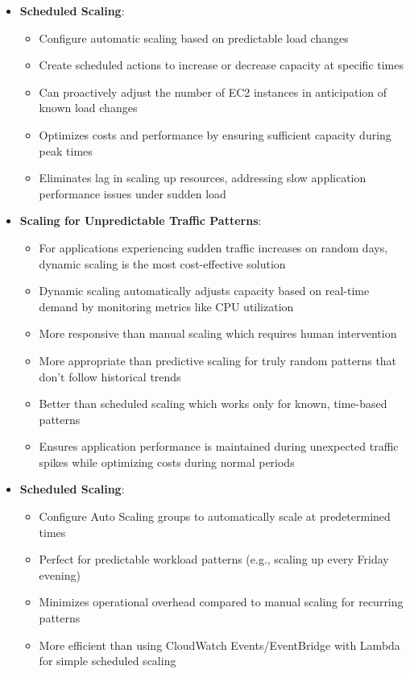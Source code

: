 \documentclass[11pt,a4paper]{report}
\begin{document}
\begin{itemize}
  \item \textbf{Scheduled Scaling}:
\begin{itemize}
  \item Configure automatic scaling based on predictable load changes
  \item Create scheduled actions to increase or decrease capacity at specific times
  \item Can proactively adjust the number of EC2 instances in anticipation of known load changes
  \item Optimizes costs and performance by ensuring sufficient capacity during peak times
  \item Eliminates lag in scaling up resources, addressing slow application performance issues under sudden load
\end{itemize}
  \item \textbf{Scaling for Unpredictable Traffic Patterns}:
\begin{itemize}
  \item For applications experiencing sudden traffic increases on random days, dynamic scaling is the most cost-effective solution
  \item Dynamic scaling automatically adjusts capacity based on real-time demand by monitoring metrics like CPU utilization
  \item More responsive than manual scaling which requires human intervention
  \item More appropriate than predictive scaling for truly random patterns that don't follow historical trends
  \item Better than scheduled scaling which works only for known, time-based patterns
  \item Ensures application performance is maintained during unexpected traffic spikes while optimizing costs during normal periods
\end{itemize}
  \item \textbf{Scheduled Scaling}:
\begin{itemize}
  \item Configure Auto Scaling groups to automatically scale at predetermined times
  \item Perfect for predictable workload patterns (e.g., scaling up every Friday evening)
  \item Minimizes operational overhead compared to manual scaling for recurring patterns
  \item More efficient than using CloudWatch Events/EventBridge with Lambda for simple scheduled scaling

\end{itemize}
\end{itemize}
\end{document}
